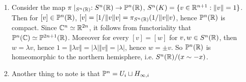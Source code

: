 \begin{remark}
\begin{enumerate}
            \item Consider the map $\pi\mid_{S^n(\mathbb{R})}: S^n(\mathbb{R}) \rightarrow \mathbb{P}^n(\mathbb{R})$, $S^n(K)=\{v\in \mathbb{R}^{n+1} : \Vert v\Vert =1\}$. Then for $[v]\in \mathbb{P}^n(\mathbb{R})$, $[v]=[1/\Vert v\Vert v]=\pi_{S^n(\mathbb{R})}(1/\Vert v\Vert v)$, hence $\mathbb{P}^n(\mathbb{R})$ is compact. Since $\mathbb{C}^n \simeq \mathbb{R}^{2n}$, it follows from functoriality that $\mathbb{P}^n(\mathbb{C})\simeq \mathbb{P}^{2n+1}(\mathbb{R})$. Moreover for every $[v]=[w]$ for $v,w\in S^n(\mathbb{R})$, then $w=\lambda v$, hence  $1=\Vert\lambda v\Vert = \vert \lambda \vert \Vert v\Vert = \vert \lambda \vert$, hence $w = \pm v$. So $\mathbb{P}^n(\mathbb{R})$ is homeomorphic to the northern hemisphere, i.e. $S^n(\mathbb{R})/(x\sim -x)$.
            \item Another thing to note is that $\mathbb{P}^n = U_i\sqcup H_{\infty,i}$
        \end{enumerate}
    \end{remark}
